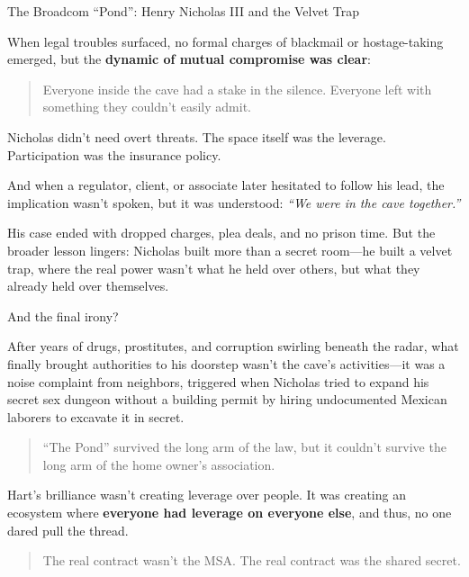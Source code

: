 \begin{HistoricalSidebar}{The Broadcom ``Pond'': Henry Nicholas III and the Velvet Trap}
  \medskip
  
  When legal troubles surfaced, no formal charges of blackmail or hostage-taking emerged, but the \textbf{dynamic of mutual compromise was clear}:  

  \begin{quote}
  Everyone inside the cave had a stake in the silence.  Everyone left with something they couldn’t easily admit.  
  \end{quote}
  
  Nicholas didn’t need overt threats. The space itself was the leverage. Participation was the insurance policy.  

  \medskip
  
  And when a regulator, client, or associate later hesitated to follow his lead, the implication wasn’t spoken, but it was understood:  \textit{“We were in the cave together.”}

  \medskip
  
  His case ended with dropped charges, plea deals, and no prison time. But the broader lesson lingers: Nicholas built more than a secret room—he built a velvet trap, where the real power wasn’t what he held over others, but what they already held over themselves.

  \medskip

  And the final irony?
  
  \medskip

  After years of drugs, prostitutes, and corruption swirling beneath the radar, what finally brought authorities to his doorstep wasn’t the cave’s activities—it was a noise complaint from neighbors, triggered when Nicholas tried to expand his secret sex dungeon without a building permit by hiring undocumented Mexican laborers to excavate it in secret.

  \begin{quote}
  ``The Pond'' survived the long arm of the law, but it couldn’t survive the long arm of the home owner's association.
  \end{quote}

\end{HistoricalSidebar}

\medskip

Hart’s brilliance wasn’t creating leverage over people. It was creating an ecosystem where \textbf{everyone had leverage on everyone else}, and thus, no one dared pull the thread.

\begin{quote}
The real contract wasn’t the MSA. The real contract was the shared secret.
\end{quote}

